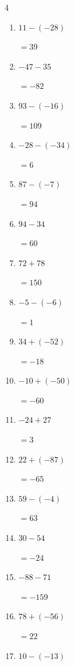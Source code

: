 \begin{multicols}{4}
\begin{enumerate}
  \item $11-(-28)$

        $=39$

  \item $-47-35$

        $=-82$

  \item $93-(-16)$

        $=109$

  \item $-28-(-34)$

        $=6$

  \item $87-(-7)$

        $=94$

  \item $94-34$

        $=60$

  \item $72+78$

        $=150$

  \item $-5-(-6)$

        $=1$

  \item $34+(-52)$

        $=-18$

  \item $-10+(-50)$

        $=-60$

\columnbreak %

  \item $-24+27$

        $=3$

  \item $22+(-87)$

        $=-65$

  \item $59-(-4)$

        $=63$

  \item $30-54$

        $=-24$

  \item $-88-71$

        $=-159$

  \item $78+(-56)$

        $=22$

  \item $10-(-13)$


\end{enumerate}
\end{multicols}
